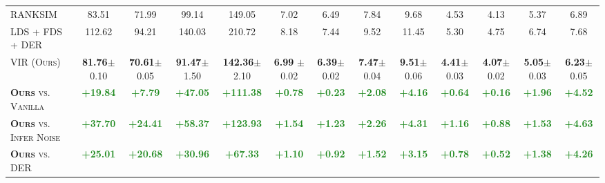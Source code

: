 \begin{table*}[h]
\begin{center}
{\begin{tabular}{l|cccc|cccc|cccc}
\textsc{RANKSIM}~\citep{RankSim} & 83.51 & 71.99 & 99.14 & 149.05 & 7.02 & 6.49 & 7.84 & 9.68 & 4.53 & 4.13 & 5.37 & 6.89 \\[1.5pt]
\textsc{LDS + FDS + DER}~\citep{DER} & 112.62 & 94.21 & 140.03 & 210.72 & 8.18 & 7.44 & 9.52 & 11.45 & 5.30 & 4.75 & 6.74 & 7.68 \\[1.5pt]
\textsc{VIR (Ours)} & \textbf{81.76}\scriptsize{$\pm$0.10} & \textbf{70.61}\scriptsize{$\pm$0.05} & \textbf{91.47}\scriptsize{$\pm$1.50} & \textbf{142.36}\scriptsize{$\pm$2.10} & \textbf{6.99} \scriptsize{$\pm$0.02} & \textbf{6.39}\scriptsize{$\pm$0.02} & \textbf{7.47}\scriptsize{$\pm$0.04} & \textbf{9.51}\scriptsize{$\pm$0.06} & \textbf{4.41}\scriptsize{$\pm$0.03} & \textbf{4.07}\scriptsize{$\pm$0.02} & \textbf{5.05}\scriptsize{$\pm$0.03} & \textbf{6.23}\scriptsize{$\pm$0.05} \\[1.5pt] \midrule\midrule
\textsc{\textbf{Ours} vs. Vanilla} & \textcolor{ForestGreen}{\textbf{+19.84}} & \textcolor{ForestGreen}{\textbf{+7.79}} & \textcolor{ForestGreen}{\textbf{+47.05}} & \textcolor{ForestGreen}{\textbf{+111.38}} & \textcolor{ForestGreen}{\textbf{+0.78}} & \textcolor{ForestGreen}{\textbf{+0.23}} & \textcolor{ForestGreen}{\textbf{+2.08}} & \textcolor{ForestGreen}{\textbf{+4.16}} & \textcolor{ForestGreen}{\textbf{+0.64}} & \textcolor{ForestGreen}{\textbf{+0.16}} & \textcolor{ForestGreen}{\textbf{+1.96}} & \textcolor{ForestGreen}{\textbf{+4.52}}  \\[1.5pt]
\textsc{\textbf{Ours} vs. Infer Noise} & \textcolor{ForestGreen}{\textbf{+37.70}} & \textcolor{ForestGreen}{\textbf{+24.41}} & \textcolor{ForestGreen}{\textbf{+58.37}} & \textcolor{ForestGreen}{\textbf{+123.93}} & \textcolor{ForestGreen}{\textbf{+1.54}} & \textcolor{ForestGreen}{\textbf{+1.23}} & \textcolor{ForestGreen}{\textbf{+2.26}} & \textcolor{ForestGreen}{\textbf{+4.31}} & \textcolor{ForestGreen}{\textbf{+1.16}} & \textcolor{ForestGreen}{\textbf{+0.88}} & \textcolor{ForestGreen}{\textbf{+1.53}} & \textcolor{ForestGreen}{\textbf{+4.63}}  \\[1.5pt]
\textsc{\textbf{Ours} vs. DER} & \textcolor{ForestGreen}{\textbf{+25.01}} & \textcolor{ForestGreen}{\textbf{+20.68}} & \textcolor{ForestGreen}{\textbf{+30.96}} & \textcolor{ForestGreen}{\textbf{+67.33}} & \textcolor{ForestGreen}{\textbf{+1.10}} & \textcolor{ForestGreen}{\textbf{+0.92}} & \textcolor{ForestGreen}{\textbf{+1.52}} & \textcolor{ForestGreen}{\textbf{+3.15}} & \textcolor{ForestGreen}{\textbf{+0.78}} & \textcolor{ForestGreen}{\textbf{+0.52}} & \textcolor{ForestGreen}{\textbf{+1.38}} & \textcolor{ForestGreen}{\textbf{+4.26}}  \\[1.5pt]

\end{tabular}}
\end{center}
\end{table*}
